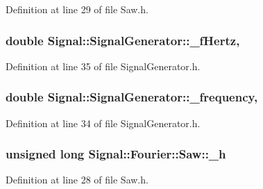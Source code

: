 Definition at line 29 of file Saw.\+h.

\hypertarget{classSignal_1_1SignalGenerator_a85a4702347352bab1c71e0a8df8437d6}{
\subsubsection[{\+\_\+f\+Hertz}]{\setlength{\rightskip}{0pt plus 5cm}double Signal\+::\+Signal\+Generator\+::\+\_\+f\+Hertz\hspace{0.3cm}{\ttfamily [protected]}, {\ttfamily [inherited]}}}\label{classSignal_1_1SignalGenerator_a85a4702347352bab1c71e0a8df8437d6}


Definition at line 35 of file Signal\+Generator.\+h.

\hypertarget{classSignal_1_1SignalGenerator_a7f107461333bce68c5dad412db96a8c2}{
\subsubsection[{\+\_\+frequency}]{\setlength{\rightskip}{0pt plus 5cm}double Signal\+::\+Signal\+Generator\+::\+\_\+frequency\hspace{0.3cm}{\ttfamily [protected]}, {\ttfamily [inherited]}}}\label{classSignal_1_1SignalGenerator_a7f107461333bce68c5dad412db96a8c2}


Definition at line 34 of file Signal\+Generator.\+h.

\hypertarget{classSignal_1_1Fourier_1_1Saw_a7e796347f04f0f4370a472587701b82b}{
\subsubsection[{\+\_\+h}]{\setlength{\rightskip}{0pt plus 5cm}unsigned long Signal\+::\+Fourier\+::\+Saw\+::\+\_\+h\hspace{0.3cm}{\ttfamily [protected]}}}\label{classSignal_1_1Fourier_1_1Saw_a7e796347f04f0f4370a472587701b82b}


Definition at line 28 of file Saw.\+h.

